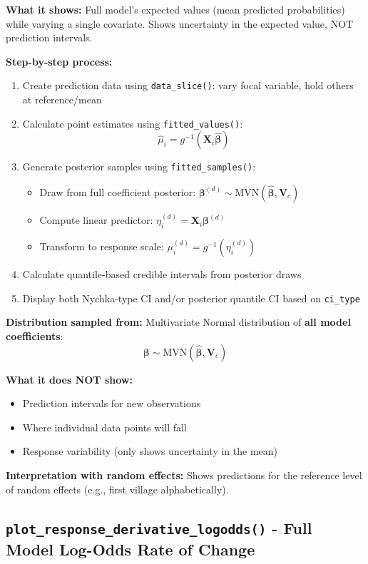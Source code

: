 \documentclass[11pt, a4paper]{article}
\begin{document}
\textbf{What it shows:} Full model's expected values (mean predicted probabilities) while varying a single covariate. Shows uncertainty in the expected value, NOT prediction intervals.

\textbf{Step-by-step process:}
\begin{enumerate}
   \item Create prediction data using \texttt{data\_slice()}: vary focal variable, hold others at reference/mean
   \item Calculate point estimates using \texttt{fitted\_values()}:
   $$\hat{\mu}_i = g^{-1}(\mathbf{X}_i \hat{\boldsymbol{\beta}})$$
   \item Generate posterior samples using \texttt{fitted\_samples()}:
   \begin{itemize}
       \item Draw from full coefficient posterior: $\boldsymbol{\beta}^{(d)} \sim \text{MVN}(\hat{\boldsymbol{\beta}}, \mathbf{V}_c)$
       \item Compute linear predictor: $\eta_i^{(d)} = \mathbf{X}_i \boldsymbol{\beta}^{(d)}$
       \item Transform to response scale: $\mu_i^{(d)} = g^{-1}(\eta_i^{(d)})$
   \end{itemize}
   \item Calculate quantile-based credible intervals from posterior draws
   \item Display both Nychka-type CI and/or posterior quantile CI based on \texttt{ci\_type}
\end{enumerate}

\textbf{Distribution sampled from:} Multivariate Normal distribution of \textbf{all model coefficients}:
$$\boldsymbol{\beta} \sim \text{MVN}(\hat{\boldsymbol{\beta}}, \mathbf{V}_c)$$

\textbf{What it does NOT show:}
\begin{itemize}
   \item Prediction intervals for new observations
   \item Where individual data points will fall
   \item Response variability (only shows uncertainty in the mean)
\end{itemize}

\textbf{Interpretation with random effects:} Shows predictions for the reference level of random effects (e.g., first village alphabetically).

\subsection*{\texttt{plot\_response\_derivative\_logodds()} - Full Model Log-Odds Rate of Change}
\end{document}
